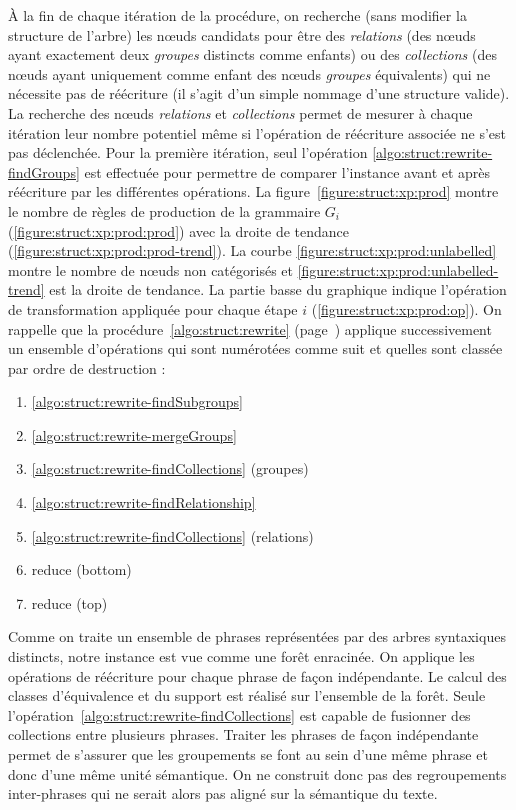 À la fin de chaque itération de la procédure, on recherche (sans modifier la structure de l'arbre) les nœuds candidats pour être des \emph{relations} (des nœuds ayant exactement deux \emph{groupes} distincts comme enfants) ou des \emph{collections} (des nœuds ayant uniquement comme enfant des nœuds \emph{groupes} équivalents) qui ne nécessite pas de réécriture (il s'agit d'un simple nommage d'une structure valide).
La recherche des nœuds \emph{relations} et \emph{collections} permet de mesurer à chaque itération leur nombre potentiel même si l'opération de réécriture associée ne s'est pas déclenchée.
Pour la première itération, seul l'opération \ref{algo:struct:rewrite-findGroups} est effectuée pour permettre de comparer l'instance avant et après réécriture par les différentes opérations.
La figure~\ref{figure:struct:xp:prod} montre le nombre de règles de production de la grammaire $G_i$ (\ref{figure:struct:xp:prod:prod}) avec la droite de tendance (\ref{figure:struct:xp:prod:prod-trend}).
La courbe \ref{figure:struct:xp:prod:unlabelled} montre le nombre de nœuds non catégorisés et \ref{figure:struct:xp:prod:unlabelled-trend} est la droite de tendance.
La partie basse du graphique indique l'opération de transformation appliquée pour chaque étape $i$ (\ref{figure:struct:xp:prod:op}).
On rappelle que la procédure~\ref{algo:struct:rewrite} (page~\pageref{algo:struct:rewrite}) applique successivement un ensemble d'opérations qui sont numérotées comme suit et quelles sont classée par ordre de destruction :
\begin{multicols}{2}
    \begin{enumerate}
        \item \ref{algo:struct:rewrite-findSubgroups}
        \item \ref{algo:struct:rewrite-mergeGroups}
        \item \ref{algo:struct:rewrite-findCollections} (groupes)
        \item \ref{algo:struct:rewrite-findRelationship}
        \item \ref{algo:struct:rewrite-findCollections} (relations)
        \item \textsf{reduce} (bottom)
        \item \textsf{reduce} (top)
    \end{enumerate}
\end{multicols}

Comme on traite un ensemble de phrases représentées par des arbres syntaxiques distincts, notre instance est vue comme une forêt enracinée.
On applique les opérations de réécriture pour chaque phrase de façon indépendante.
Le calcul des classes d'équivalence et du support est réalisé sur l'ensemble de la forêt.
Seule l'opération~\ref{algo:struct:rewrite-findCollections} est capable de fusionner des collections entre plusieurs phrases.
Traiter les phrases de façon indépendante permet de s'assurer que les groupements se font au sein d'une même phrase et donc d'une même unité sémantique.
On ne construit donc pas des regroupements inter-phrases qui ne serait alors pas aligné sur la sémantique du texte.

